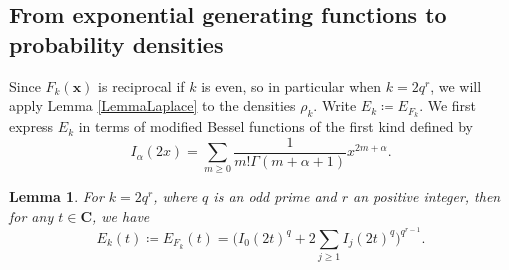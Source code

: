 \documentclass[12pt,reqno]{amsart}
\theoremstyle{definition}
\theoremstyle{plain}
\newtheorem{lemma}[theorem]{Lemma}
\theoremstyle{definition}
\newcommand{\Cc}{\mathbf{C}}
\newcommand\x{\mathbf{x}}
\renewcommand{\geq}{\geqslant}
\begin{document}
\subsection{From exponential generating functions to probability densities}

Since $F_k(\x)$ is reciprocal if $k$ is even, so in particular when $k = 2q^r$, we will apply Lemma \ref{LemmaLaplace} to the densities $\rho_k$. Write $E_k \coloneqq  E_{F_{k}}$. We first express $E_k$ in terms of modified Bessel functions of the first kind defined by 
\[
I_\alpha(2x) = \sum_{m \geq 0} \frac{1}{m! \Gamma(m + \alpha + 1)} x^{2m + \alpha}. 
\]

\begin{lemma}
	\label{besselidentity}
	For $k = 2 q^r$, where $q$ is an odd prime and $r$ an positive integer, then for any $t \in \Cc$, we have 
	\[
	E_k(t) \coloneqq  E_{F_k}(t) = \Big(I_0(2t)^q + 2\sum_{j \geq 1} I_{j}(2t)^q\Big)^{q^{r-1}}.\]
\end{lemma}
\end{document}
